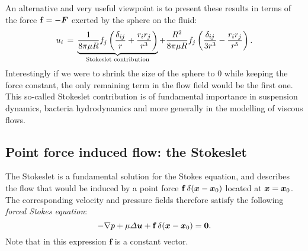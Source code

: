 An alternative and very useful viewpoint is to present these results in terms of the force $\mathbf f=-\bF$ exerted by the sphere on the fluid:
\begin{equation}
u_i \,=\, \underbrace{\frac{1}{8 \pi\mu R}f_j\left(\frac{\delta_{ij}}{r}+\frac{r_ir_j}{r^3}\right)}_\text{Stokeslet contribution} +\frac{R^2}{8\pi\mu R}f_j\left(\frac{\delta_{ij}}{3r^3}-\frac{r_ir_j}{r^5}\right).
\label{eq:stokes_force_sphere}
\end{equation}
Interestingly if we were to shrink the size of the sphere to 0 while keeping the force constant, the only remaining term in the flow field would be the first one. This so-called Stokeslet contribution is of fundamental importance in suspension dynamics, bacteria hydrodynamics and more generally in the modelling of viscous flows.
\subsection{Point force induced flow: the Stokeslet}
The Stokeslet is a fundamental solution for the Stokes equation, and describes the flow that would be induced by a point force $\mathbf f\, \delta(\bx-\bx_0)$ located at $\bx = \bx_0$. The corresponding velocity and pressure fields therefore satisfy the following \textit{forced Stokes equation}:
\begin{equation}
-\nabla p + \mu \Delta \bu + \mathbf f \,\delta(\bx-\bx_0) = \matrixsym 0.
\label{eq:forced_stokes_equation}
\end{equation}
Note that in this expression $\mathbf f$ is a constant vector. 

